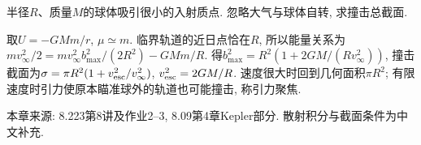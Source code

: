 \begin{example}
半径$R$、质量$M$的球体吸引很小的入射质点. 忽略大气与球体自转, 求撞击总截面.
\end{example}
\begin{solution}
取$U=-GMm/r$, $\mu\simeq m$. 临界轨道的近日点恰在$R$, 所以能量关系为$m v_\infty^2/2=m v_\infty^2b_{\max}^2/(2R^2)-GMm/R$. 得$b_{\max}^2=R^2(1+2GM/(Rv_\infty^2))$, 撞击截面为$\sigma=\pi R^2(1+v_{\rm esc}^2/v_\infty^2)$, $v_{\rm esc}^2=2GM/R$. 速度很大时回到几何面积$\pi R^2$; 有限速度时引力使原本瞄准球外的轨道也可能撞击, 称引力聚焦.
\end{solution}
本章来源: 8.223第8讲及作业2--3, 8.09第4章Kepler部分. 散射积分与截面条件为中文补充.
